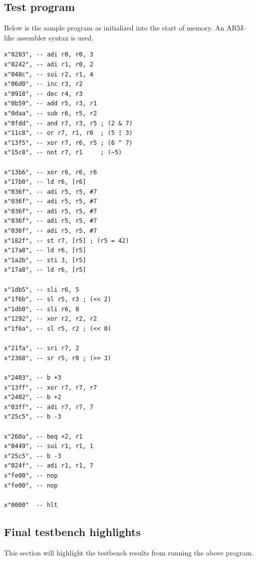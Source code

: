 \documentclass[a4paper]{article}
\numberwithin{figure}{section}
\numberwithin{table}{section}
\begin{document}
\subsection{Test program}
Below is the sample program as initialized into the start of memory. An ARM-like assembler syntax is used.
\begin{verbatim}
x"0203", -- adi r0, r0, 3
x"0242", -- adi r1, r0, 2
x"048c", -- sui r2, r1, 4
x"06d0", -- inc r3, r2
x"0918", -- dec r4, r3
x"0b59", -- add r5, r3, r1
x"0daa", -- sub r6, r5, r2
x"0fdd", -- and r7, r3, r5 ; (2 & 7)
x"11c8", -- or r7, r1, r0  ; (5 | 3)
x"13f5", -- xor r7, r6, r5 ; (6 ^ 7)
x"15c8", -- not r7, r1     ; (~5)

x"13b6", -- xor r6, r6, r6
x"17b0", -- ld r6, [r6]
x"036f", -- adi r5, r5, #7
x"036f", -- adi r5, r5, #7
x"036f", -- adi r5, r5, #7
x"036f", -- adi r5, r5, #7
x"036f", -- adi r5, r5, #7
x"182f", -- st r7, [r5] ; (r5 = 42)
x"17a8", -- ld r6, [r5]
x"1a2b", -- sti 3, [r5]
x"17a8", -- ld r6, [r5]

x"1db5", -- sli r6, 5
x"1f6b", -- sl r5, r3 ; (<< 2)
x"1db0", -- sli r6, 0
x"1292", -- xor r2, r2, r2
x"1f6a", -- sl r5, r2 ; (<< 0)

x"21fa", -- sri r7, 2
x"2368", -- sr r5, r0 ; (>> 3)

x"2403", -- b +3
x"13ff", -- xor r7, r7, r7
x"2402", -- b +2
x"03ff", -- adi r7, r7, 7
x"25c5", -- b -3

x"260a", -- beq +2, r1
x"0449", -- sui r1, r1, 1
x"25c5", -- b -3
x"024f", -- adi r1, r1, 7
x"fe00", -- nop
x"fe00", -- nop

x"0000"  -- hlt
\end{verbatim}

\newpage
\subsection{Final testbench highlights}
This section will highlight the testbench results from running the above program.
\end{document}
